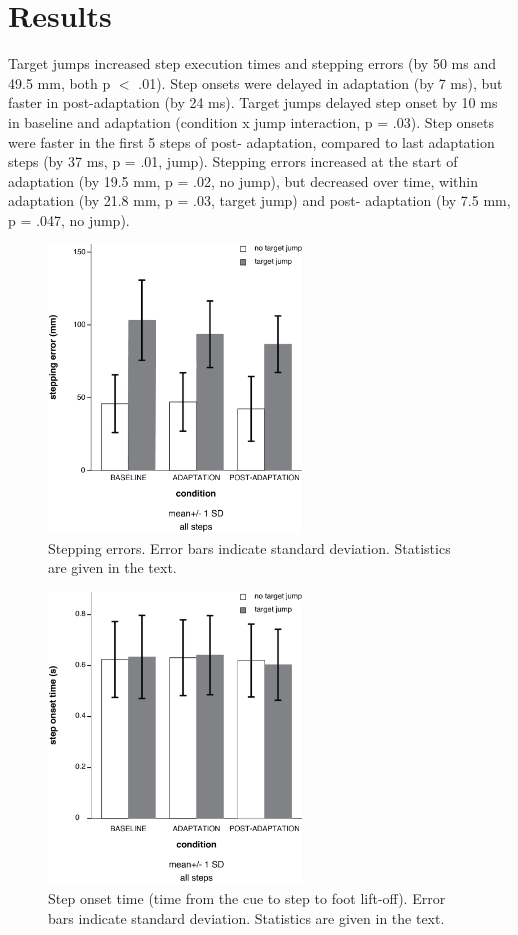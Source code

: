 \section{Results}
Target jumps increased step execution times and stepping errors (by 50 ms and 49.5 mm, both p $<$ .01).  Step onsets were delayed in adaptation (by 7 ms), but faster in post-adaptation (by 24 ms). Target jumps delayed step onset by 10 ms in baseline and adaptation (condition x jump interaction, p = .03). Step onsets were faster in the first 5 steps of post- adaptation, compared to last adaptation steps (by 37 ms, p = .01, jump). Stepping errors increased at the start of adaptation (by 19.5 mm, p = .02, no jump), but decreased over time, within adaptation (by 21.8 mm, p = .03, target jump) and post- adaptation (by 7.5 mm, p = .047, no jump).

\begin{figure}[!ht]
	\centering
    \includegraphics[width=0.6\textwidth]{"Zrinka/step error-all steps"}
	\caption{Stepping errors. Error bars indicate standard deviation. Statistics are given in the text.}
	\label{fig:stepErrorAll}
\end{figure}

\begin{figure}[!ht]
	\centering
	\includegraphics[width=0.6\textwidth]{"Zrinka/step onset time-all steps"}
	\caption{Step onset time (time from the cue to step to foot lift-off). Error bars indicate standard deviation. Statistics are given in the text.}
	\label{fig:stepOnsetTimeAll}
\end{figure}

